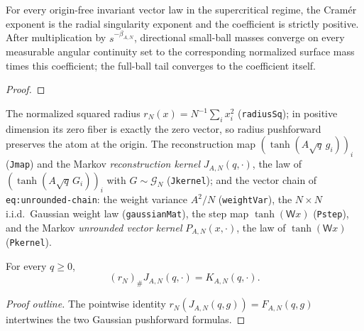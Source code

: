 \begin{theorem}
  \label{thm:nd-power-singularity}
  \leanok
  For every origin-free invariant vector law in the supercritical regime, the
  Cram\'er exponent is the radial singularity exponent and the coefficient is
  strictly positive.  After multiplication by $s^{-\beta_{A,N}}$, directional
  small-ball masses converge on every measurable angular continuity set to the
  corresponding normalized surface mass times this coefficient; the full-ball
  tail converges to the coefficient itself.
\end{theorem}
\begin{proof}\leanok\end{proof}

\begin{definition}
  \label{def:reduction-kernels}
  \leanok
  The normalized squared radius $r_N(x)=N^{-1}\sum_i x_i^2$
  (\texttt{radiusSq}); in positive dimension its zero fiber is exactly the
  zero vector, so radius pushforward preserves the atom at the origin. The
  reconstruction map $(\tanh(A\sqrt q\,g_i))_i$ (\texttt{Jmap})
  and the Markov \emph{reconstruction kernel} $J_{A,N}(q,\cdot)$, the law of
  $(\tanh(A\sqrt q\,G_i))_i$ with $G\sim\mathcal G_N$ (\texttt{Jkernel}); and the vector
  chain of \texttt{eq:unrounded-chain}: the weight variance $A^2/N$ (\texttt{weightVar}),
  the $N\times N$ i.i.d.\ Gaussian weight law (\texttt{gaussianMat}), the step map
  $\tanh(\mathsf Wx)$ (\texttt{Pstep}), and the Markov \emph{unrounded vector kernel}
  $P_{A,N}(x,\cdot)$, the law of $\tanh(\mathsf Wx)$ (\texttt{Pkernel}).
\end{definition}

\begin{lemma}
  \label{lem:radius-factorization}
  \leanok
  For every $q\geq0$,
  \[
    (r_N)_\# J_{A,N}(q,\cdot)=K_{A,N}(q,\cdot).
  \]
\end{lemma}
\begin{proof}[Proof outline]
  \leanok
  The pointwise identity $r_N(J_{A,N}(q,g))=F_{A,N}(q,g)$ intertwines the two
  Gaussian pushforward formulas.
\end{proof}

